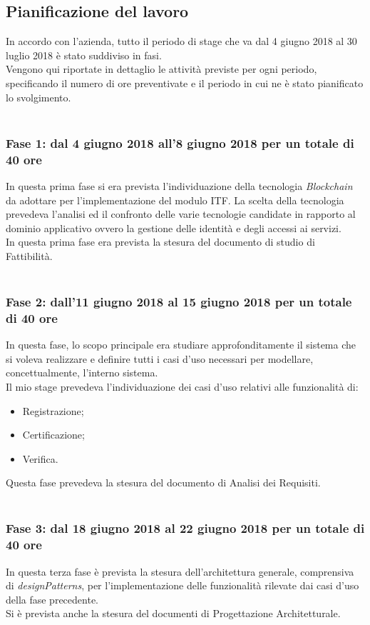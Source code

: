 \subsection{Pianificazione del lavoro}
\label{sec:pianificazione_del_lavoro}
In accordo con l'azienda, tutto il periodo di stage che va dal 4 giugno 2018 al 30 luglio 2018 è stato suddiviso in fasi.\\
Vengono qui riportate in dettaglio le attività previste per ogni periodo, specificando il numero di ore preventivate e il periodo in cui ne è stato pianificato lo svolgimento.\\\\
\subsubsection{Fase 1: dal 4 giugno 2018 all'8 giugno 2018 per un totale di 40 ore}
In questa prima fase si era prevista l'individuazione della tecnologia \textit{Blockchain} da adottare per l'implementazione del modulo \gls{ITF}. La scelta della tecnologia prevedeva l'analisi ed il confronto delle varie tecnologie candidate in rapporto al dominio applicativo ovvero la gestione delle identità e degli accessi ai servizi.\\
In questa prima fase era prevista la stesura del documento di studio di Fattibilità.\\\\

\subsubsection{Fase 2: dall'11 giugno 2018 al 15 giugno 2018 per un totale di 40 ore}
In questa fase, lo scopo principale era studiare approfonditamente il sistema che si voleva realizzare e definire tutti i casi d'uso necessari per modellare, concettualmente, l'interno sistema.\\
Il mio stage prevedeva l'individuazione dei casi d'uso relativi alle funzionalità di:
\begin{itemize}
	\item Registrazione;
	\item Certificazione;
	\item Verifica.
\end{itemize}
Questa fase prevedeva la stesura del documento di Analisi dei Requisiti.\\\\

\subsubsection{Fase 3: dal 18 giugno 2018 al 22 giugno 2018 per un totale di 40 ore}
In questa terza fase è prevista la stesura dell'architettura generale, comprensiva di \emph{\gls{designPatterns}}\glsfirstoccur, per l'implementazione delle funzionalità rilevate dai casi d'uso della fase precedente.\\
Si è prevista anche la stesura del documenti di Progettazione Architetturale.\\\\

